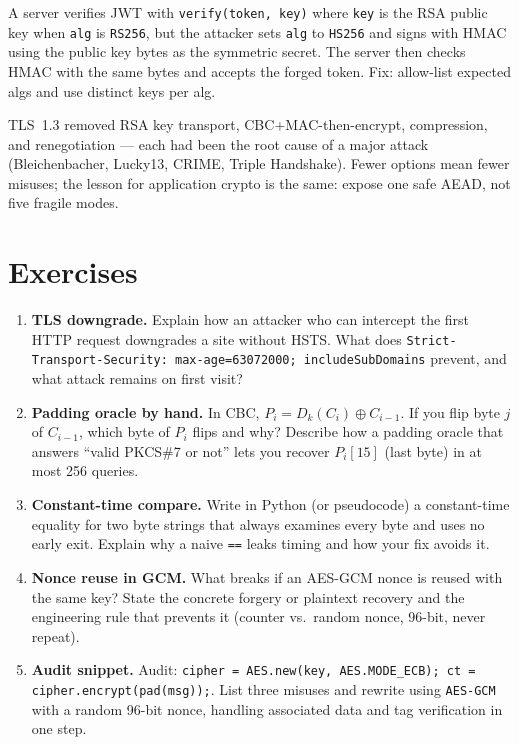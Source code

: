 \begin{example}
A server verifies JWT with \texttt{verify(token, key)} where \texttt{key} is the RSA public key when \texttt{alg} is \texttt{RS256}, but the attacker sets \texttt{alg} to \texttt{HS256} and signs with HMAC using the public key bytes as the symmetric secret. The server then checks HMAC with the same bytes and accepts the forged token. Fix: allow-list expected algs and use distinct keys per alg.
\end{example}


\begin{remark}
TLS~1.3 removed RSA key transport, CBC+MAC-then-encrypt, compression, and renegotiation --- each had been the root cause of a major attack (Bleichenbacher, Lucky13, CRIME, Triple Handshake). Fewer options mean fewer misuses; the lesson for application crypto is the same: expose one safe AEAD, not five fragile modes.
\end{remark}

\section{Exercises}
\label{sec:ch04-exercises}
\begin{enumerate}[label=E4.\arabic*, leftmargin=*, itemsep=0.6em]
    \item \textbf{TLS downgrade.} Explain how an attacker who can intercept the first HTTP request downgrades a site without HSTS. What does \texttt{Strict-Transport-Security: max-age=63072000; includeSubDomains} prevent, and what attack remains on first visit?
    \item \textbf{Padding oracle by hand.} In CBC, $P_i = D_k(C_i)\oplus C_{i-1}$. If you flip byte $j$ of $C_{i-1}$, which byte of $P_i$ flips and why? Describe how a padding oracle that answers ``valid PKCS\#7 or not'' lets you recover $P_i[15]$ (last byte) in at most 256 queries.
    \item \textbf{Constant-time compare.} Write in Python (or pseudocode) a constant-time equality for two byte strings that always examines every byte and uses no early exit. Explain why a naive \texttt{==} leaks timing and how your fix avoids it.
    \item \textbf{Nonce reuse in GCM.} What breaks if an AES-GCM nonce is reused with the same key? State the concrete forgery or plaintext recovery and the engineering rule that prevents it (counter vs.\ random nonce, 96-bit, never repeat).
    \item \textbf{Audit snippet.} Audit: \texttt{cipher = AES.new(key, AES.MODE\_ECB); ct = cipher.encrypt(pad(msg));}. List three misuses and rewrite using \texttt{AES-GCM} with a random 96-bit nonce, handling associated data and tag verification in one step.
\end{enumerate}

